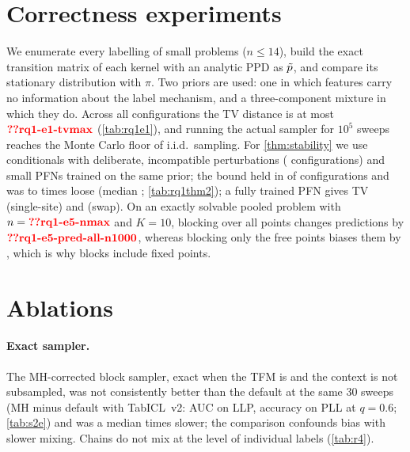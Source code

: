\section{Correctness experiments}\label{app:rq1}
We enumerate every labelling of small problems ($n\le14$), build the exact transition matrix of each kernel with an
analytic PPD as $\tilde p$, and compare its stationary distribution with $\pi$. Two priors are used: one in which features
carry no information about the label mechanism, and a three-component mixture in which they do. Across all
 configurations the TV distance is at most $\val{rq1-e1-tvmax}$ (\cref{tab:rq1e1}), and running the
actual sampler for $10^5$ sweeps reaches the Monte Carlo floor of i.i.d.\ sampling. For \cref{thm:stability} we use
conditionals with deliberate, incompatible perturbations ( configurations) and small PFNs trained on the same
prior; the bound held in  of  configurations and was  to
 times loose (median ; \cref{tab:rq1thm2}); a fully trained PFN gives TV
 (single-site) and  (swap). On an exactly solvable pooled problem with
$n=\val{rq1-e5-nmax}$ and $K=10$, blocking over all points changes predictions by $\val{rq1-e5-pred-all-n1000}$, whereas
blocking only the free points biases them by , which is why blocks include fixed points.
\begin{table}[!htbp]
\centering
\caption{Exactness (\cref{thm:exact}, \cref{prop:blocks}(a)): TV between the stationary distribution of the exact kernel
and $\pi$.}
\label{tab:rq1e1}
\small

\end{table}
\begin{table}[!htbp]
\centering
\caption{Stability (\cref{thm:stability}): actual TV between the stationary distributions of the approximate and exact
chains, the bound $\tau(P)\bar\varepsilon$, and their ratio (looseness).}
\label{tab:rq1thm2}
\small
\resizebox{\textwidth}{!}{}
\end{table}

\FloatBarrier
\section{Ablations}\label{app:ablations}
\paragraph{Exact sampler.} The MH-corrected block sampler, exact when the TFM is and the context is not subsampled, was not consistently better than the default at the same 30 sweeps (MH minus default with
TabICL~v2:  AUC on LLP,  accuracy on PLL at $q=0.6$; \cref{tab:s2e}) and was a median
 times slower; the comparison confounds bias with slower mixing. Chains do not
mix at the level of individual labels (\cref{tab:r4}).

